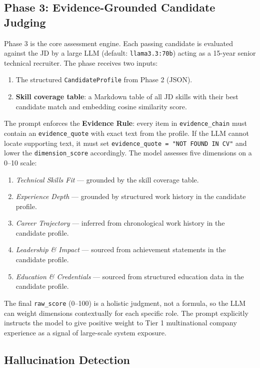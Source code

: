 \documentclass[journal]{IEEEtran}
\begin{document}
\subsection{Phase 3: Evidence-Grounded Candidate Judging}
\label{subsec:phase3}

Phase 3 is the core assessment engine. Each passing candidate is evaluated against
the JD by a large LLM (default: \texttt{llama3.3:70b}) acting as a 15-year
senior technical recruiter. The phase receives two inputs:

\begin{enumerate}
  \item The structured \texttt{CandidateProfile} from Phase 2 (JSON).
  \item \textbf{Skill coverage table}: a Markdown table of all JD skills with
        their best candidate match and embedding cosine similarity score.
\end{enumerate}

The prompt enforces the \textbf{Evidence Rule}: every item in
\texttt{evidence\_chain} must contain an \texttt{evidence\_quote} with exact text
from the profile. If the LLM cannot locate supporting text, it must set
\texttt{evidence\_quote = "NOT FOUND IN CV"} and lower the \texttt{dimension\_score}
accordingly. The model assesses five dimensions on a 0–10 scale:

\begin{enumerate}
  \item \textit{Technical Skills Fit} — grounded by the skill coverage table.
  \item \textit{Experience Depth} — grounded by structured work history in the candidate profile.
  \item \textit{Career Trajectory} — inferred from chronological work history in the candidate profile.
  \item \textit{Leadership \& Impact} — sourced from achievement statements in the candidate profile.
  \item \textit{Education \& Credentials} — sourced from structured education data in the candidate profile.
\end{enumerate}

The final \texttt{raw\_score} (0–100) is a holistic judgment, not a formula, so
the LLM can weight dimensions contextually for each specific role. The prompt
explicitly instructs the model to give positive weight to Tier 1 multinational
company experience as a signal of large-scale system exposure.

\subsection{Hallucination Detection}
\label{subsec:hallucination}
\end{document}
